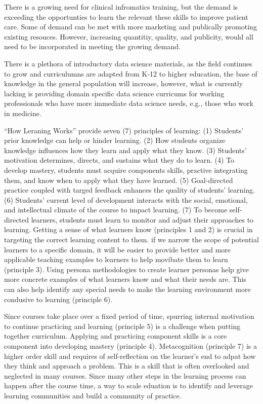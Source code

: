 \documentclass[030-workshop.tex]{subfiles}
\begin{document}
    There is a growing need for clinical infromatics training,
    but the demand is exceeding the opportunties to learn the relevant these skills to improve patient care.
    Some of demand can be met with more marketing and publically promoting existing resouces.
    However, increasing quantitiy, quality, and publicity, would all need to be incorporated
    in meeting the growing demand.

    There is a plethora of introductory data science materials,
    as the field continues to grow and curriculumns are adapted from K-12 to higher education,
    the base of knowledge in the general population will increase,
    however, what is currently lacking is providing domain specific data science curricums
    for working professionals who have more immediate data science needs, e.g., those who work in medicine.

    ``How Leraning Works'' provide seven (7) principles of learning:
    (1) Students' prior knowledge can help or hinder learning.
    (2) How students organize knowledge influences how they learn and apply what they know.
    (3) Students' motivation determines, directs, and sustains what they do to learn.
    (4) To develop mastery, students must acquire components skills, practive integrating them, and know when to apply what they have learned.
    (5) Goal-directed practice coupled with targed feedback enhances the quality of students' learning.
    (6) Students' current level of development interacts with the social, emotional, and intellectual climate of the course to impact learning.
    (7) To become self-directed learners, students must learn to monitor and adjust their approaches to learning.
    Getting a sense of what learners know (principles 1 and 2) is crucial in targeting
    the correct learning content to them.
    if we narrow the scope of potential learners to a specific domain,
    it will be easier to provide better and more applicable teaching examples to learners
    to help movibate them to learn (principle 3).
    Using persona methodologies to create learner personas help give more concrete examples
    of what learners know and what their needs are.
    This can also help identify any special needs to make the learning environment more condusive to learning (principle 6).

    Since courses take place over a fixed period of time,
    spurring internal motivation to continue practicing and learning (principle 5) is a challenge when putting together curriculum.
    Applying and practicing component skills is a core component into developing mastery (principle 4).
    Metacognition (principle 7) is a higher order skill and requires of self-reflection on the learner's end
    to adpat how they think and approach a problem.
    This is a skill that is often overlooked and neglected in many courses.
    Since many other steps in the learning process can happen after the course time,
    a way to scale eduation is to identify and leverage learning communities
    and build a community of practice. %
\end{document}
